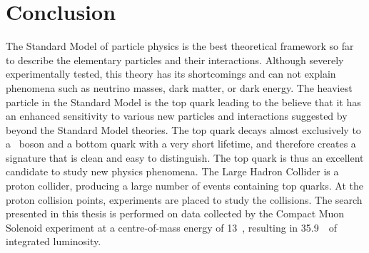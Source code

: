 \section{Conclusion}
The Standard Model of particle physics is the best theoretical framework so far to describe the elementary particles and their interactions. Although severely experimentally tested, this theory has its shortcomings and can not explain phenomena such as neutrino masses, dark matter, or dark energy. The heaviest particle in the Standard Model is the top quark leading to the believe that it has an enhanced sensitivity to various new particles and interactions suggested by beyond the Standard Model theories. The top quark decays almost exclusively to a \PW\ boson and a bottom quark with a very short lifetime, and therefore creates a signature that is clean and easy to distinguish. The top quark is thus an excellent candidate to study new physics phenomena. The Large Hadron Collider is a proton collider, producing a large number of events containing top quarks. At the proton collision points, experiments are placed to study the collisions. The search presented in this thesis is performed on data collected by the Compact Muon Solenoid experiment at a centre-of-mass energy of 13~\TeV, resulting in 35.9~\fbinv\ of integrated luminosity. 


